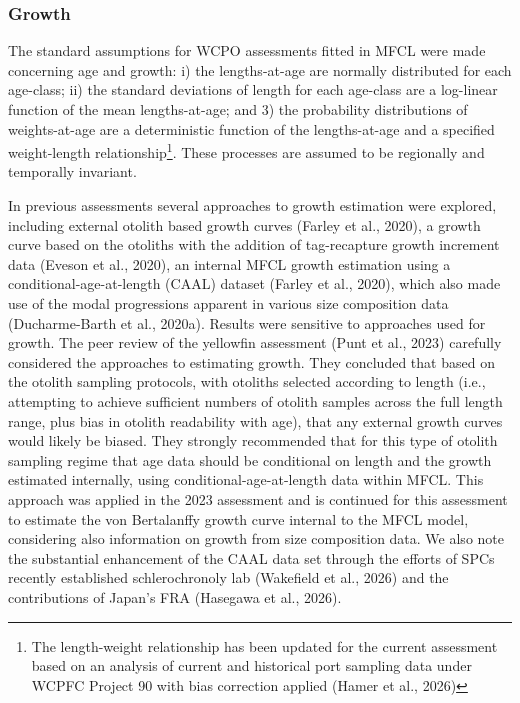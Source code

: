 \documentclass[
  english,
  a4paper,
  a4paper,
  11pt]{SCreport}
\begin{document}
\subsubsection{Growth}\label{sec-model-growth}

The standard assumptions for WCPO assessments fitted in MFCL were made
concerning age and growth: i) the lengths-at-age are normally
distributed for each age-class; ii) the standard deviations of length
for each age-class are a log-linear function of the mean lengths-at-age;
and 3) the probability distributions of weights-at-age are a
deterministic function of the lengths-at-age and a specified
weight-length relationship\footnote{The length-weight relationship has
  been updated for the current assessment based on an analysis of
  current and historical port sampling data under WCPFC Project 90 with
  bias correction applied (Hamer et al., 2026)}. These processes are
assumed to be regionally and temporally invariant.

In previous assessments several approaches to growth estimation were
explored, including external otolith based growth curves (Farley et al.,
2020), a growth curve based on the otoliths with the addition of
tag-recapture growth increment data (Eveson et al., 2020), an internal
MFCL growth estimation using a conditional-age-at-length (CAAL) dataset
(Farley et al., 2020), which also made use of the modal progressions
apparent in various size composition data (Ducharme-Barth et al.,
2020a). Results were sensitive to approaches used for growth. The peer
review of the yellowfin assessment (Punt et al., 2023) carefully
considered the approaches to estimating growth. They concluded that
based on the otolith sampling protocols, with otoliths selected
according to length (i.e., attempting to achieve sufficient numbers of
otolith samples across the full length range, plus bias in otolith
readability with age), that any external growth curves would likely be
biased. They strongly recommended that for this type of otolith sampling
regime that age data should be conditional on length and the growth
estimated internally, using conditional-age-at-length data within MFCL.
This approach was applied in the 2023 assessment and is continued for
this assessment to estimate the von Bertalanffy growth curve internal to
the MFCL model, considering also information on growth from size
composition data. We also note the substantial enhancement of the CAAL
data set through the efforts of SPCs recently established
schlerochronoly lab (Wakefield et al., 2026) and the contributions of
Japan's FRA (Hasegawa et al., 2026).
\end{document}
